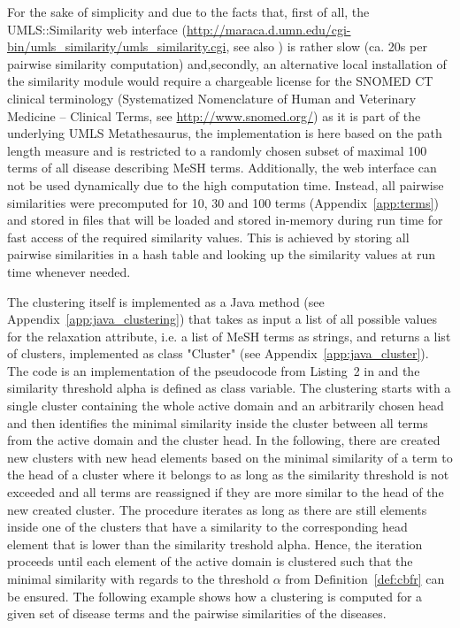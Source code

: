 For the sake of simplicity and due to the facts that, first of all, the UMLS::Similarity web interface
(\url{http://maraca.d.umn.edu/cgi-bin/umls_similarity/umls_similarity.cgi}, see also \citep{UMLS::Sim}) is rather slow (ca. 20s per pairwise similarity 
computation) and,secondly, an alternative local installation of the similarity module \citep{McInnes2009} would require a chargeable license for the SNOMED CT
clinical terminology (Systematized Nomenclature of Human and Veterinary Medicine – Clinical Terms, see \url{http://www.snomed.org/}) as it is part of the
underlying UMLS Metathesaurus, the implementation is here based on the path length measure and is restricted to a randomly chosen subset of maximal 100 terms 
of all disease describing MeSH terms. Additionally, the web interface can not be used dynamically due to the high computation time. Instead, all pairwise
similarities were precomputed for 10, 30 and 100 terms (Appendix~\ref{app:terms}) and stored in files that will be loaded and stored in-memory during run time
for fast access of the required similarity values. This is achieved by storing all pairwise similarities in a hash table and looking up the similarity values
at run time whenever needed.

The clustering itself is implemented as a Java method (see Appendix~\ref{app:java_clustering}) that takes as input a list of all possible values for the
relaxation attribute, i.e. a list of MeSH terms as strings, and returns a list of clusters, implemented as class "Cluster" (see
Appendix~\ref{app:java_cluster}). The code is an implementation of the pseudocode from Listing~2 in \cite{Wiese2014} and the similarity threshold alpha is
defined as class variable. The clustering starts with a single cluster containing the whole active domain and an arbitrarily chosen head and then identifies
the minimal similarity inside the cluster between all terms from the active domain and the cluster head. In the following, there are created new clusters with 
new head elements based on the minimal similarity of a term to the head of a cluster where it belongs to as long as the similarity threshold is not exceeded 
and all terms are reassigned if they are more similar to the head of the new created cluster. The procedure iterates as long as there are still elements inside
one of the clusters that have a similarity to the corresponding head element that is lower than the similarity treshold alpha. Hence, the iteration proceeds
until each element of the active domain is clustered such that the minimal similarity with regards to the threshold $\alpha$ from Definition~\ref{def:cbfr}
can be ensured. The following example shows how a clustering is computed for a given set of disease terms and the pairwise similarities of the diseases.

